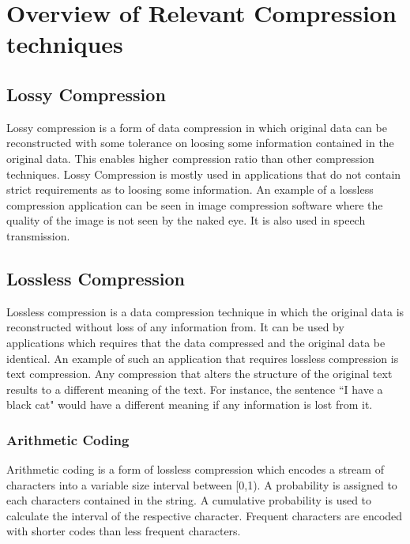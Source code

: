 \section{Overview of Relevant Compression techniques}

\subsection{Lossy Compression}

Lossy compression is a form of data compression in which original data can be reconstructed with some tolerance on loosing some information contained in the original data. This enables higher compression ratio than other compression techniques. Lossy Compression is mostly used in applications that do not contain strict requirements as to loosing some information. An example of a lossless compression application can be seen in image compression software where the quality of the image is not seen by the naked eye. It is also used in speech transmission. 

\subsection{Lossless Compression}
Lossless compression is a data compression technique in which the original data is reconstructed without loss of any information from. It can be used by applications which requires that the data compressed and the original data be identical. An example of such an application that requires lossless compression is text compression.  Any compression that alters the structure of the original text results to a different meaning of the text. For instance, the sentence ``I have a black cat" would have a different meaning if any information is lost from it.



\subsubsection{Arithmetic Coding}

Arithmetic coding is a form of lossless compression which encodes a stream of characters into a variable size interval between [0,1). A probability is assigned to each characters contained in the string. A cumulative probability is used to calculate the interval of the respective character. Frequent characters are encoded with shorter codes than less frequent characters. 
